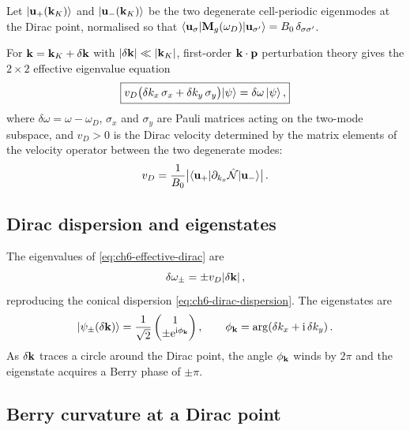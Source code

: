 Let $|\mathbf{u}_+(\mathbf{k}_K)\rangle$ and $|\mathbf{u}_-(\mathbf{k}_K)\rangle$ be
the two degenerate cell-periodic eigenmodes at the Dirac point,
normalised so that
$\langle\mathbf{u}_\sigma|\mathbf{M}_g(\omega_D)|\mathbf{u}_{\sigma'}\rangle
=B_0\,\delta_{\sigma\sigma'}$.

For $\mathbf{k}=\mathbf{k}_K+\delta\mathbf{k}$ with $|\delta\mathbf{k}|\ll|\mathbf{k}_K|$,
first-order $\mathbf{k}\cdot\mathbf{p}$ perturbation theory gives the
$2\times 2$ effective eigenvalue equation
\begin{equation}\label{eq:ch6-effective-dirac}
  \boxed{%
  v_D\bigl(\delta k_x\,\sigma_x + \delta k_y\,\sigma_y\bigr)
  |\psi\rangle
  = \delta\omega\,|\psi\rangle\,,}
\end{equation}
where $\delta\omega=\omega-\omega_D$, $\sigma_x$ and $\sigma_y$ are
Pauli matrices acting on the two-mode subspace, and $v_D>0$ is the
Dirac velocity determined by the matrix elements of the velocity
operator between the two degenerate modes:
\begin{equation}\label{eq:ch6-vD}
  v_D = \frac{1}{B_0}
  \bigl|\langle\mathbf{u}_+|\partial_{k_x}\hat{\mathcal{N}}|\mathbf{u}_-\rangle
  \bigr|\,.
\end{equation}

\subsection{Dirac dispersion and eigenstates}
\label{sec:ch6-dirac-eigenstates}

The eigenvalues of \eqref{eq:ch6-effective-dirac} are
\begin{equation}\label{eq:ch6-dirac-eval}
  \delta\omega_\pm = \pm v_D|\delta\mathbf{k}|\,,
\end{equation}
reproducing the conical dispersion \eqref{eq:ch6-dirac-dispersion}.
The eigenstates are
\begin{equation}\label{eq:ch6-dirac-evec}
  |\psi_\pm(\delta\mathbf{k})\rangle
  = \frac{1}{\sqrt{2}}
  \begin{pmatrix} 1 \\ \pm\mathrm{e}^{\mathrm{i}\phi_{\mathbf{k}}} \end{pmatrix},
  \qquad \phi_{\mathbf{k}} = \arg(\delta k_x + \mathrm{i}\,\delta k_y)\,.
\end{equation}
As $\delta\mathbf{k}$ traces a circle around the Dirac point, the angle
$\phi_{\mathbf{k}}$ winds by $2\pi$ and the eigenstate acquires a Berry phase
of $\pm\pi$.

\subsection{Berry curvature at a Dirac point}
\label{sec:ch6-dirac-berry}

